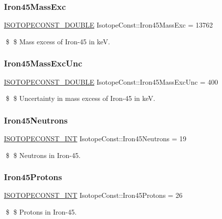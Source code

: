 \subsubsection{\texorpdfstring{Iron45\+Mass\+Exc}{Iron45MassExc}}
{\footnotesize\ttfamily \mbox{\hyperlink{group___isotope_const-_macros_ga8f45a7272ce02c0b4c65c44636ed719a}{I\+S\+O\+T\+O\+P\+E\+C\+O\+N\+S\+T\+\_\+\+D\+O\+U\+B\+LE}} Isotope\+Const\+::\+Iron45\+Mass\+Exc = 13762}

\$ \$ Mass excess of Iron-\/45 in keV. \mbox{\label{group___isotope_const-_iron-_fe45_ga0681f31eefbb7aca213a1ea76a0ae023}} 
\subsubsection{\texorpdfstring{Iron45\+Mass\+Exc\+Unc}{Iron45MassExcUnc}}
{\footnotesize\ttfamily \mbox{\hyperlink{group___isotope_const-_macros_ga8f45a7272ce02c0b4c65c44636ed719a}{I\+S\+O\+T\+O\+P\+E\+C\+O\+N\+S\+T\+\_\+\+D\+O\+U\+B\+LE}} Isotope\+Const\+::\+Iron45\+Mass\+Exc\+Unc = 400}

\$ \$ Uncertainty in mass excess of Iron-\/45 in keV. \mbox{\label{group___isotope_const-_iron-_fe45_ga8ddc54238f20ccfd754e8b6bc495bd7a}} 
\subsubsection{\texorpdfstring{Iron45\+Neutrons}{Iron45Neutrons}}
{\footnotesize\ttfamily \mbox{\hyperlink{group___isotope_const-_macros_ga5f18360b3e99483a35c32d789e62621c}{I\+S\+O\+T\+O\+P\+E\+C\+O\+N\+S\+T\+\_\+\+I\+NT}} Isotope\+Const\+::\+Iron45\+Neutrons = 19}

\$ \$ Neutrons in Iron-\/45. \mbox{\label{group___isotope_const-_iron-_fe45_gabc91f35d73974beaccc1650aa6172fd6}} 
\subsubsection{\texorpdfstring{Iron45\+Protons}{Iron45Protons}}
{\footnotesize\ttfamily \mbox{\hyperlink{group___isotope_const-_macros_ga5f18360b3e99483a35c32d789e62621c}{I\+S\+O\+T\+O\+P\+E\+C\+O\+N\+S\+T\+\_\+\+I\+NT}} Isotope\+Const\+::\+Iron45\+Protons = 26}

\$ \$ Protons in Iron-\/45. 